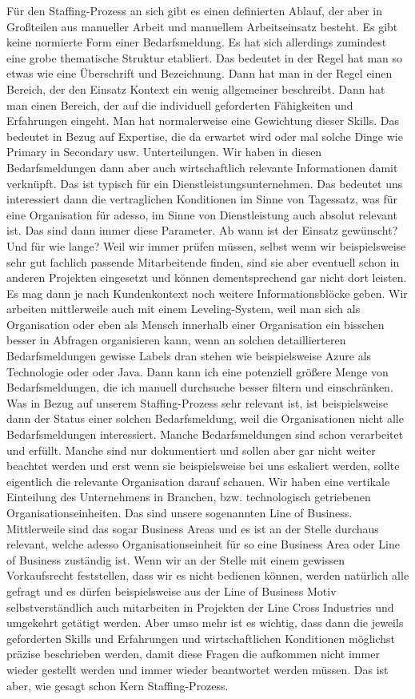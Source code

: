 Für den Staffing-Prozess an sich gibt es einen definierten Ablauf, der aber in Großteilen aus manueller Arbeit und manuellem Arbeitseinsatz besteht. Es gibt keine normierte Form einer Bedarfsmeldung. Es hat sich allerdings zumindest eine grobe thematische Struktur etabliert. Das bedeutet in der Regel hat man so etwas wie eine Überschrift und Bezeichnung. Dann hat man in der Regel einen Bereich, der den Einsatz Kontext ein wenig allgemeiner beschreibt. Dann hat man einen Bereich, der auf die individuell geforderten Fähigkeiten und Erfahrungen eingeht. Man hat normalerweise eine Gewichtung dieser Skills. Das bedeutet in Bezug auf Expertise, die da erwartet wird oder mal solche Dinge wie Primary in Secondary usw. Unterteilungen. Wir haben in diesen Bedarfsmeldungen dann aber auch wirtschaftlich relevante Informationen damit verknüpft. Das ist typisch für ein Dienstleistungsunternehmen. Das bedeutet uns interessiert dann die vertraglichen Konditionen im Sinne von Tagessatz, was für eine Organisation für adesso, im Sinne von Dienstleistung auch absolut relevant ist. Das sind dann immer diese Parameter. Ab wann ist der Einsatz gewünscht? Und für wie lange? Weil wir immer prüfen müssen, selbst wenn wir beispielsweise sehr gut fachlich passende Mitarbeitende finden, sind sie aber eventuell schon in anderen Projekten eingesetzt und können dementsprechend gar nicht dort leisten. Es mag dann je nach Kundenkontext noch weitere Informationsblöcke geben. Wir arbeiten mittlerweile auch mit einem Leveling-System, weil man sich als Organisation oder eben als Mensch innerhalb einer Organisation ein bisschen besser in Abfragen organisieren kann, wenn an solchen detaillierteren Bedarfsmeldungen gewisse Labels dran stehen wie beispielsweise Azure als Technologie oder oder Java. Dann kann ich eine potenziell größere Menge von Bedarfsmeldungen, die ich manuell durchsuche besser filtern und einschränken. Was in Bezug auf unserem Staffing-Prozess sehr relevant ist, ist beispielsweise dann der Status einer solchen Bedarfsmeldung, weil die Organisationen nicht alle Bedarfsmeldungen interessiert. Manche Bedarfsmeldungen sind schon verarbeitet und erfüllt. Manche sind nur dokumentiert und sollen aber gar nicht weiter beachtet werden und erst wenn sie beispielsweise bei uns eskaliert werden, sollte eigentlich die relevante Organisation darauf schauen. Wir haben eine vertikale Einteilung des Unternehmens in Branchen, bzw. technologisch getriebenen Organisationseinheiten. Das sind unsere sogenannten Line of Business. Mittlerweile sind das sogar Business Areas und es ist an der Stelle durchaus relevant, welche adesso Organisationseinheit für so eine Business Area oder Line of Business zuständig ist. Wenn wir an der Stelle mit einem gewissen Vorkaufsrecht feststellen, dass wir es nicht bedienen können, werden natürlich alle gefragt und es dürfen beispielsweise aus der Line of Business Motiv selbstverständlich auch mitarbeiten in Projekten der Line Cross Industries und umgekehrt getätigt werden. Aber umso mehr ist es wichtig, dass dann die jeweils geforderten Skills und Erfahrungen und wirtschaftlichen Konditionen möglichst präzise beschrieben werden, damit diese Fragen die aufkommen nicht immer wieder gestellt werden und immer wieder beantwortet werden müssen. Das ist aber, wie gesagt schon Kern Staffing-Prozess.

